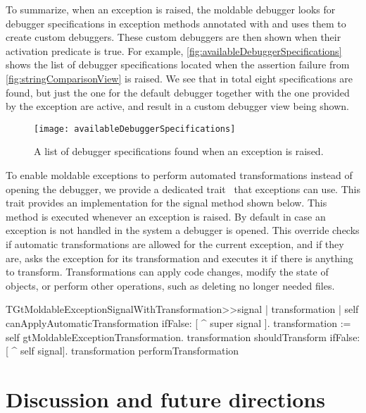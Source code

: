 \documentclass[sigplan,anonymous,review,10pt]{acmart}
\begin{document}
To summarize, when an exception is raised, the moldable debugger looks for debugger specifications in exception methods annotated with   and uses them to create custom debuggers.
These custom debuggers are then shown when their activation predicate is true.
For example, \autoref{fig:availableDebuggerSpecifications} shows the list of debugger specifications located when the assertion failure from \autoref{fig:stringComparisonView} is raised.
We see that in total eight specifications are found, but just the one for the default debugger together with the one provided by the exception are active, and result in a custom debugger view being shown.

\begin{figure}[h]
  \texttt{[image: availableDebuggerSpecifications]}
  \caption{A list of debugger specifications found when an exception is raised.}
  \label{fig:availableDebuggerSpecifications}
\end{figure}

To enable moldable exceptions to perform automated transformations instead of opening the debugger, we provide a dedicated trait~\cite{Duca06b} that exceptions can use.
This trait provides an implementation for the signal method shown below.
This method is executed whenever an exception is raised.
By default in case an exception is not handled in the system a debugger is opened.
This override checks if automatic transformations are allowed for the current exception, and if they are, asks the exception for its transformation and executes it if there is anything to transform.
Transformations can apply code changes, modify the state of objects, or perform other operations, such as deleting no longer needed files.

\begin{code}
TGtMoldableExceptionSignalWithTransformation>>signal
	| transformation |
	self canApplyAutomaticTransformation
		ifFalse: [ ^ super signal ].
	transformation := self gtMoldableExceptionTransformation.
	transformation shouldTransform
		ifFalse: [ ^ self signal].
	transformation performTransformation
\end{code}

\section{Discussion and future directions}\label{sec:directions}
\end{document}
